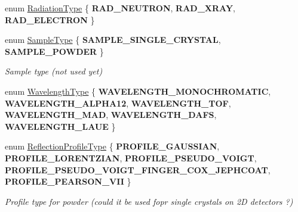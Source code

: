 \begin{DoxyCompactItemize}
\item 
enum \mbox{\hyperlink{namespace_obj_cryst_a48fe50a094c607f8897378934d3d73ef}{Radiation\+Type}} \{ {\bfseries R\+A\+D\+\_\+\+N\+E\+U\+T\+R\+ON}, 
{\bfseries R\+A\+D\+\_\+\+X\+R\+AY}, 
{\bfseries R\+A\+D\+\_\+\+E\+L\+E\+C\+T\+R\+ON}
 \}
\item 
\mbox{\label{namespace_obj_cryst_a0b2cfd80574d1e282f2ab8ec7aaf587d}} 
enum \mbox{\hyperlink{namespace_obj_cryst_a0b2cfd80574d1e282f2ab8ec7aaf587d}{Sample\+Type}} \{ {\bfseries S\+A\+M\+P\+L\+E\+\_\+\+S\+I\+N\+G\+L\+E\+\_\+\+C\+R\+Y\+S\+T\+AL}, 
{\bfseries S\+A\+M\+P\+L\+E\+\_\+\+P\+O\+W\+D\+ER}
 \}
\begin{DoxyCompactList}\small\item\em Sample type (not used yet) \end{DoxyCompactList}\item 
enum \mbox{\hyperlink{namespace_obj_cryst_a551a5807d5afe2d986758d9a6953a880}{Wavelength\+Type}} \{ \newline
{\bfseries W\+A\+V\+E\+L\+E\+N\+G\+T\+H\+\_\+\+M\+O\+N\+O\+C\+H\+R\+O\+M\+A\+T\+IC}, 
{\bfseries W\+A\+V\+E\+L\+E\+N\+G\+T\+H\+\_\+\+A\+L\+P\+H\+A12}, 
{\bfseries W\+A\+V\+E\+L\+E\+N\+G\+T\+H\+\_\+\+T\+OF}, 
{\bfseries W\+A\+V\+E\+L\+E\+N\+G\+T\+H\+\_\+\+M\+AD}, 
\newline
{\bfseries W\+A\+V\+E\+L\+E\+N\+G\+T\+H\+\_\+\+D\+A\+FS}, 
{\bfseries W\+A\+V\+E\+L\+E\+N\+G\+T\+H\+\_\+\+L\+A\+UE}
 \}
\item 
\mbox{\label{namespace_obj_cryst_a0997f99fe92ed00498e2ed57d51b8aad}} 
enum \mbox{\hyperlink{namespace_obj_cryst_a0997f99fe92ed00498e2ed57d51b8aad}{Reflection\+Profile\+Type}} \{ \newline
{\bfseries P\+R\+O\+F\+I\+L\+E\+\_\+\+G\+A\+U\+S\+S\+I\+AN}, 
{\bfseries P\+R\+O\+F\+I\+L\+E\+\_\+\+L\+O\+R\+E\+N\+T\+Z\+I\+AN}, 
{\bfseries P\+R\+O\+F\+I\+L\+E\+\_\+\+P\+S\+E\+U\+D\+O\+\_\+\+V\+O\+I\+GT}, 
{\bfseries P\+R\+O\+F\+I\+L\+E\+\_\+\+P\+S\+E\+U\+D\+O\+\_\+\+V\+O\+I\+G\+T\+\_\+\+F\+I\+N\+G\+E\+R\+\_\+\+C\+O\+X\+\_\+\+J\+E\+P\+H\+C\+O\+AT}, 
\newline
{\bfseries P\+R\+O\+F\+I\+L\+E\+\_\+\+P\+E\+A\+R\+S\+O\+N\+\_\+\+V\+II}
 \}
\begin{DoxyCompactList}\small\item\em Profile type for powder (could it be used fopr single crystals on 2D detectors ?) \end{DoxyCompactList}\item 

\end{DoxyCompactItemize}
